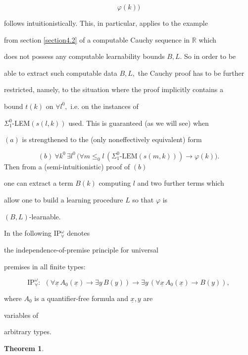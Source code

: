 \documentclass[1p]{elsarticle}
\newcommand{\RR}{\ensuremath{\mathbb{R}}}
\theoremstyle{plain}
\newtheorem{thm}{Theorem}[section]
\theoremstyle{definition}
\theoremstyle{remark}
\theoremstyle{definition}
\begin{document}
{\[\varphi(k)) \] 

follows intuitionistically. This, in particular, applies to the example 

from section \ref{section4.2} of a computable Cauchy sequence in $\RR$ which 

does not possess any computable learnability bounds $B,L.$ So in order to be 

able to extract such computable data $B,L,$ the Cauchy proof has to be further 

restricted, namely, to the situation where the proof implicitly contains a 

bound $t(k)$ on $\forall l^0,$ i.e. on the instances of 

$\Sigma^0_1$-LEM$(s(l,k))$ used. This is guaranteed (as we will see) when 

$(a)$ is strengthened to the (only noneffectively equivalent) form 



\[ (b) \ \forall k^0 \,\exists l^0\, 

\big( \forall m\le_0 l \,(\Sigma^0_1\mbox{-LEM}(s(m,k)))

\rightarrow 

\varphi(k)). \]  Then from a (semi-intuitionistic) proof of $(b)$ 

one can extract a term $B(k)$ computing $l$ and two further terms which 

allow one to build a learning procedure $L$ so that $\varphi$ is 

$(B,L)$-learnable. 

 

In the following IP$^{\omega}_{\forall}$ denotes 

the independence-of-premise principle for universal 

premises in all finite types:

\[\mbox{IP}^{\omega}_{\forall}: \ \ (\forall \underline{x}\,A_0(\underline{x})

\to\exists y \,

B(y))\rightarrow \exists y\,( \forall \underline{x}\,

A_0(\underline{x})\to B(y)), \]

where $A_0$ is a quantifier-free formula and $\underline{x},y$ are 

variables of 

arbitrary types.

\begin{thm}\label{t:bdLem}


\end{thm}}
\end{document}
